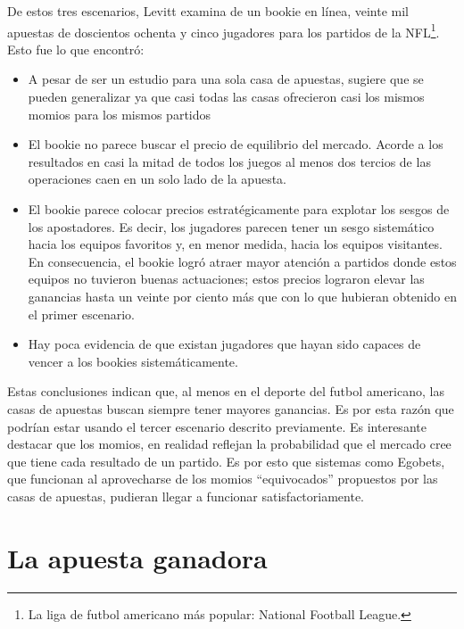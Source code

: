  De estos tres escenarios, Levitt \cite{levitt2004gambling} examina de un bookie en línea, veinte mil apuestas de doscientos ochenta y cinco jugadores para los partidos de la NFL\footnote{La liga de futbol americano más popular: National Football League.}. Esto fue lo que encontró:
 \begin{itemize}
  \item A pesar de ser un estudio para una sola casa de apuestas, sugiere que se pueden generalizar ya que casi todas las casas ofrecieron casi los mismos momios para los mismos partidos
  \item El bookie no parece buscar el precio de equilibrio del mercado. Acorde a los resultados en casi la mitad de todos los juegos al menos dos tercios de las operaciones caen en un solo lado de la apuesta.
  \item El bookie parece colocar precios estratégicamente para explotar los sesgos de los apostadores. Es decir, los jugadores parecen tener un sesgo sistemático hacia los equipos favoritos y, en menor medida, hacia los equipos visitantes. En consecuencia, el bookie logró atraer mayor atención a partidos donde estos equipos no tuvieron buenas actuaciones; estos precios lograron elevar las ganancias hasta un veinte por ciento más que con lo que hubieran obtenido en el primer escenario.
  \item Hay poca evidencia de que existan jugadores que hayan sido capaces de vencer a los bookies sistemáticamente.
  \end{itemize}
 
 Estas conclusiones indican que, al menos en el deporte del futbol americano, las casas de apuestas buscan siempre tener mayores ganancias. Es por esta razón que podrían estar usando el tercer escenario descrito previamente. Es interesante destacar que los momios, en realidad reflejan la probabilidad que el mercado cree que tiene cada resultado de un partido. Es por esto que sistemas como Egobets, que funcionan al aprovecharse de los momios ``equivocados'' propuestos por las casas de apuestas, pudieran llegar a funcionar satisfactoriamente.
 
 
 \section{La apuesta ganadora}

